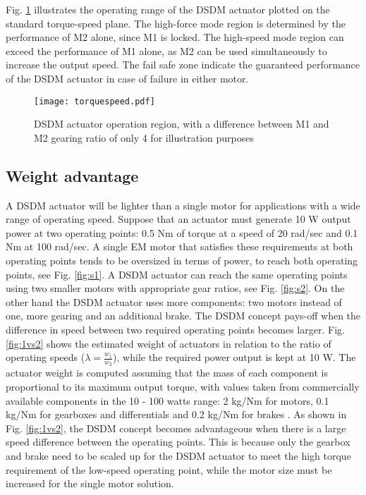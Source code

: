 Fig. \ref{fig:torquespeed} illustrates the operating range of the DSDM actuator plotted on the standard torque-speed plane. The high-force mode region is determined by the performance of M2 alone, since M1 is locked. The high-speed mode region can exceed the performance of M1 alone, as M2 can be used simultaneously to increase the output speed. The fail safe zone indicate the guaranteed performance of the DSDM actuator in case of failure in either motor. 

\begin{figure}[H]
	\centering
		\texttt{[image: torquespeed.pdf]}
	\caption[DSDM actuator operation region]{DSDM actuator operation region, with a difference between M1 and M2 gearing ratio of only 4 for illustration purposes }
	\label{fig:torquespeed}
\end{figure}

\subsection{Weight advantage}
\label{sec:WeightAdvantage}


A DSDM actuator will be lighter than a single motor for applications with a wide range of operating speed. Suppose that an actuator must generate 10 W output power at two operating points: 0.5 Nm of torque at a speed of 20 rad/sec and 0.1 Nm at 100 rad/sec. A single EM motor that satisfies these requirements at both operating points tends to be oversized in terms of power, to reach both operating points, see Fig. \ref{fig:s1}. A DSDM actuator can reach the same operating points using two smaller motors with appropriate gear ratios, see Fig. \ref{fig:s2}. On the other hand the DSDM actuator uses more components: two motors instead of one, more gearing and an additional brake. The DSDM concept pays-off when the difference in speed between two required operating points becomes larger.  Fig. \ref{fig:1vs2} shows the estimated weight of actuators in relation to the ratio of operating speeds ($\lambda=\frac{w_1}{w_2}$), while the required power output is kept at 10 W. The actuator weight is computed assuming that the mass of each component is proportional to its maximum output torque, with values taken from commercially available components in the 10 - 100 watts range: 2 kg/Nm for motors, 0.1 kg/Nm for gearboxes and differentials and 0.2 kg/Nm for brakes \cite{maxon_motor_usa}. As shown in Fig. \ref{fig:1vs2}, the DSDM concept becomes advantageous when there is a large speed difference between the operating points. This is because only the gearbox and brake need to be scaled up for the DSDM actuator to meet the high torque requirement of the low-speed operating point, while the motor size must be increased for the single motor solution.

